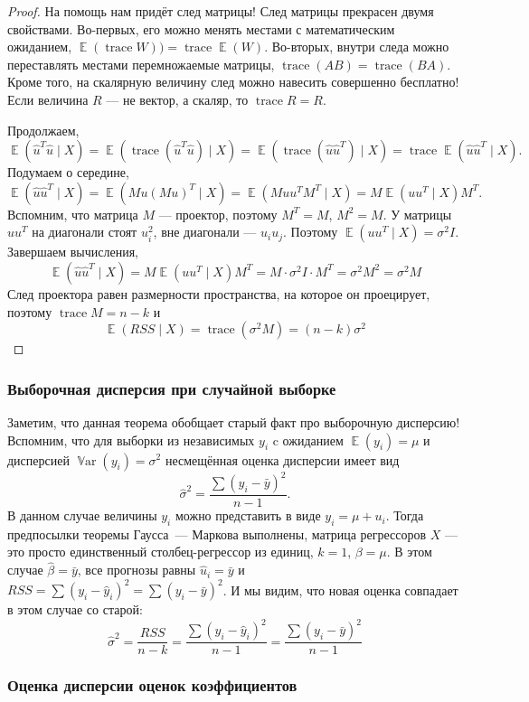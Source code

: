\documentclass[12pt]{article}
\DeclareMathOperator{\Var}{\mathbb{V}ar}
\DeclareMathOperator{\E}{\mathbb{E}}
\DeclareMathOperator{\trace}{trace}
\newcommand{\hb}{\hat{\beta}}
\newcommand{\hu}{\hat{u}}
\newcommand{\hy}{\hat{y}}
\newcommand{\RSS}{RSS}
\begin{document}
\begin{proof}
На помощь нам придёт след матрицы! 
След матрицы прекрасен двумя свойствами. 
Во-первых, его можно менять местами с математическим ожиданием, $\E(\trace W)) = \trace \E(W)$. 
Во-вторых, внутри следа можно переставлять местами перемножаемые матрицы, $\trace (AB) = \trace (BA)$. 
Кроме того, на скалярную величину след можно навесить совершенно бесплатно!
Если величина $R$ — не вектор, а скаляр, то $\trace R = R$.

Продолжаем,
\[
\E(\hu^T \hu \mid X) = \E(\trace (\hu^T \hu) \mid X) = \E( \trace(\hu \hu^T)\mid X) = \trace \E(\hu \hu^T \mid X).
\]
Подумаем о середине,
\[
\E(\hu \hu^T \mid X) = \E(Mu (Mu)^T \mid X) = \E(Mu u^T M^T \mid X) = M \E(uu^T \mid X) M^T.
\]
Вспомним, что матрица $M$ — проектор, поэтому $M^T = M$, $M^2 = M$.
У матрицы $uu^T$ на диагонали стоят $u_i^2$, вне диагонали — $u_iu_j$.
Поэтому $\E(uu^T\mid X) = \sigma^2 I$.
Завершаем вычисления,
\[
\E(\hu \hu^T \mid X) =  M \E(uu^T \mid X) M^T= M \cdot \sigma^2 I \cdot M^T = \sigma^2 M^2 = \sigma^2 M
\]
След проектора равен размерности пространства, на которое он проецирует, поэтому $\trace M = n - k$ и
\[
\E(RSS \mid X) = \trace(\sigma^2 M) = (n - k) \sigma^2
\]
\end{proof}

\subsubsection*{Выборочная дисперсия при случайной выборке}

Заметим, что данная теорема обобщает старый факт про выборочную дисперсию!
Вспомним, что для выборки из независимых $y_i$ c ожиданием $\E(y_i) = \mu$ и дисперсией $\Var(y_i) = \sigma^2$ несмещённая оценка дисперсии имеет вид 
\[
\hat\sigma^2 = \frac{\sum(y_i - \bar y)^2}{n - 1}.
\]
В данном случае величины $y_i$ можно представить в виде $y_i = \mu + u_i$.
Тогда предпосылки теоремы Гаусса~— Маркова выполнены, матрица регрессоров $X$  — это просто единственный столбец-регрессор из единиц, $k = 1$, $\beta = \mu$. 
В этом случае $\hb = \bar y$, все прогнозы равны $\hu_i = \bar y$ и $\RSS = \sum (y_i - \hy_i)^2 = \sum (y_i - \bar y)^2$.
И мы видим, что новая оценка совпадает в этом случае со старой:
\[
\hat\sigma^2 = \frac{\RSS}{n- k} = \frac{\sum (y_i - \hy_i)^2}{ n - 1} = \frac{\sum (y_i - \bar y)^2}{n - 1}
\]

\subsubsection*{Оценка дисперсии оценок коэффициентов}
\end{document}
